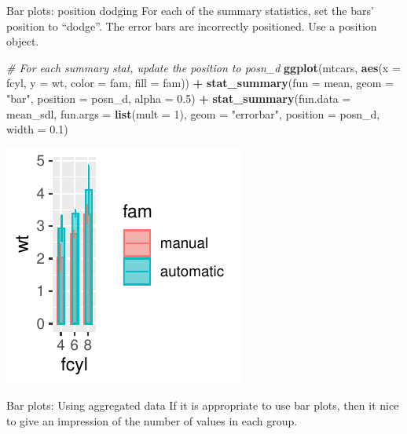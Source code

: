 \documentclass[
  ignorenonframetext,
]{beamer}
\newenvironment{Shaded}{\begin{snugshade}}{\end{snugshade}}
\newcommand{\AttributeTok}[1]{\textcolor[rgb]{0.13,0.29,0.53}{#1}}
\newcommand{\CommentTok}[1]{\textcolor[rgb]{0.56,0.35,0.01}{\textit{#1}}}
\newcommand{\DecValTok}[1]{\textcolor[rgb]{0.00,0.00,0.81}{#1}}
\newcommand{\FloatTok}[1]{\textcolor[rgb]{0.00,0.00,0.81}{#1}}
\newcommand{\FunctionTok}[1]{\textcolor[rgb]{0.13,0.29,0.53}{\textbf{#1}}}
\newcommand{\NormalTok}[1]{#1}
\newcommand{\SpecialCharTok}[1]{\textcolor[rgb]{0.81,0.36,0.00}{\textbf{#1}}}
\newcommand{\StringTok}[1]{\textcolor[rgb]{0.31,0.60,0.02}{#1}}
\begin{document}
\begin{frame}[fragile]{Bar plots: position dodging}
\label{bar-plots-position-dodging-3}
For each of the summary statistics, set the bars' position to ``dodge''.
The error bars are incorrectly positioned. Use a position object.


\begin{Shaded}
\begin{Highlighting}[]
\CommentTok{\# For each summary stat, update the position to posn\_d}
\FunctionTok{ggplot}\NormalTok{(mtcars, }\FunctionTok{aes}\NormalTok{(}\AttributeTok{x =}\NormalTok{ fcyl, }\AttributeTok{y =}\NormalTok{ wt, }\AttributeTok{color =}\NormalTok{ fam, }\AttributeTok{fill =}\NormalTok{ fam)) }\SpecialCharTok{+}
    \FunctionTok{stat\_summary}\NormalTok{(}\AttributeTok{fun =}\NormalTok{ mean, }\AttributeTok{geom =} \StringTok{"bar"}\NormalTok{, }\AttributeTok{position =}\NormalTok{ posn\_d,}
        \AttributeTok{alpha =} \FloatTok{0.5}\NormalTok{) }\SpecialCharTok{+} \FunctionTok{stat\_summary}\NormalTok{(}\AttributeTok{fun.data =}\NormalTok{ mean\_sdl, }\AttributeTok{fun.args =} \FunctionTok{list}\NormalTok{(}\AttributeTok{mult =} \DecValTok{1}\NormalTok{),}
    \AttributeTok{geom =} \StringTok{"errorbar"}\NormalTok{, }\AttributeTok{position =}\NormalTok{ posn\_d, }\AttributeTok{width =} \FloatTok{0.1}\NormalTok{)}
\end{Highlighting}
\end{Shaded}

\begin{center}\includegraphics[width=0.5\linewidth]{Figs/unnamed-chunk-107-1} \end{center}
\end{frame}

\begin{frame}{Bar plots: Using aggregated data}
\label{bar-plots-using-aggregated-data}
If it is appropriate to use bar plots, then it nice to give an
impression of the number of values in each group.
\end{frame}
\end{document}

